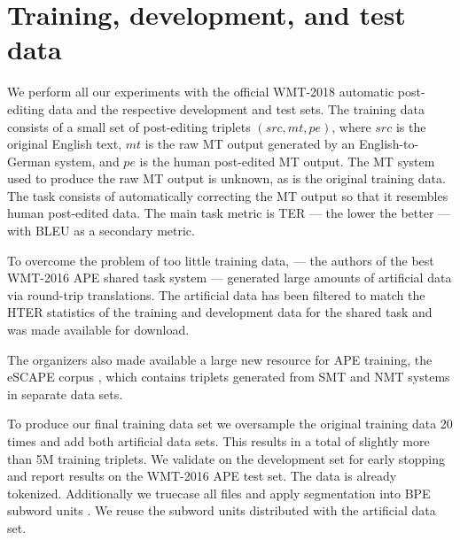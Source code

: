 \documentclass[11pt,a4paper]{article}
\newcommand{\src}[0]{{src}}
\newcommand{\pe}[0]{{pe}}
\newcommand{\mt}[0]{{mt}}
\begin{document}
\section{Training, development, and test data}

We perform all our experiments with the official WMT-2018 automatic post-editing data and the respective development and test sets. The training data consists of a small set of post-editing triplets $(\src,\mt,\pe)$, where $\src$ is the original English text, $\mt$ is the raw MT output generated by an English-to-German system, and $\pe$ is the human post-edited MT output. The MT system used to produce the raw MT output is unknown, as is the original training data. The task consists of automatically correcting the MT output so that it resembles human post-edited data. The main task metric is TER \cite{citeulike:1874459} --- the lower the better --- with BLEU \cite{Papineni:2002:BMA:1073083.1073135} as a secondary metric.

To overcome the problem of too little training data,  --- the authors of the best WMT-2016 APE shared task system --- generated large amounts of artificial data via round-trip translations.
The artificial data has been filtered to match the HTER statistics of the training and development data for the shared task and was made available for download. 

The organizers also made available a large new resource for APE training, the eSCAPE corpus \cite{DBLP:journals/corr/abs-1803-07274}, which contains triplets generated from SMT and NMT systems in separate data sets.


To produce our final training data set we oversample the original training data 20 times and add both artificial data sets. This results in a total of slightly more than 5M training triplets.
We validate on the development set for early stopping and report results on the WMT-2016 APE test set. The data is already tokenized. Additionally we truecase all files and apply segmentation into BPE subword units \cite{sennrich2016bpe}. We reuse the subword units distributed with the artificial data set.
\end{document}
